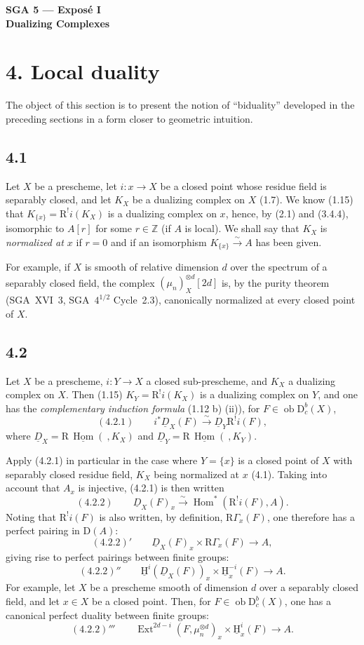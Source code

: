 \documentclass[11pt]{article}
\providecommand{\uH}{\underline{\mathrm H}}
\DeclareMathOperator{\Hom}{Hom}
\DeclareMathOperator{\Ext}{Ext}
\newcommand{\R}{\mathrm{R}}
\newcommand{\D}{\mathrm{D}}
\newcommand{\Z}{\mathbb{Z}}
\newcommand{\ob}{\operatorname{ob}}
\begin{document}
\begin{center}{\Large \textbf{SGA 5 --- Exposé I}}\\{\large \textbf{Dualizing Complexes}}\end{center}


\section*{4. Local duality}

The object of this section is to present the notion of ``biduality'' developed in the preceding sections in a form closer to geometric intuition.

\subsection*{4.1}
Let $X$ be a prescheme, let $i:x\to X$ be a closed point whose residue field is separably closed, and let $K_X$ be a dualizing complex on $X$ (1.7). We know (1.15) that $K_{\{x\}}=\R^{!}i(K_X)$ is a dualizing complex on $x$, hence, by (2.1) and (3.4.4), isomorphic to $A[r]$ for some $r\in\Z$ (if $A$ is local). We shall say that $K_X$ is \emph{normalized at $x$} if $r=0$ and if an isomorphism $K_{\{x\}}\xrightarrow{\sim}A$ has been given.

For example, if $X$ is smooth of relative dimension $d$ over the spectrum of a separably closed field, the complex $(\mu_n)_X^{\otimes d}[2d]$ is, by the purity theorem (SGA~XVI~3, SGA~$4^{1/2}$ Cycle~2.3), canonically normalized at every closed point of $X$.

\subsection*{4.2}
Let $X$ be a prescheme, $i:Y\to X$ a closed sub-prescheme, and $K_X$ a dualizing complex on $X$. Then (1.15) $K_Y=\R^{!}i(K_X)$ is a dualizing complex on $Y$, and one has the \emph{complementary induction formula} (1.12 b) (ii)), for $F\in \ob\D_c^b(X)$,
\[
(4.2.1)\qquad i^*\underline{D}_X(F)\xrightarrow{\sim}\underline{D}_Y\R^{!}i(F),
\]
where $\underline{D}_X=\R\,\underline{\Hom}(\ ,K_X)$ and $\underline{D}_Y=\R\,\underline{\Hom}(\ ,K_Y)$.

Apply (4.2.1) in particular in the case where $Y=\{x\}$ is a closed point of $X$ with separably closed residue field, $K_X$ being normalized at $x$ (4.1). Taking into account that $A_x$ is injective, (4.2.1) is then written
\[
(4.2.2)\qquad \underline{D}_X(F)_x\xrightarrow{\sim}\Hom^*(\R^{!}i(F),A).
\]
Noting that $\R^{!}i(F)$ is also written, by definition, $\R\Gamma_x(F)$, one therefore has a perfect pairing in $\D(A)$:
\[
(4.2.2)'\qquad \underline{D}_X(F)_x\times \R\Gamma_x(F)\longrightarrow A,
\]
giving rise to perfect pairings between finite groups:
\[
(4.2.2)''\qquad \uH^i(\underline{D}_X(F))_x\times \uH_x^{-i}(F)\longrightarrow A.
\]
For example, let $X$ be a prescheme smooth of dimension $d$ over a separably closed field, and let $x\in X$ be a closed point. Then, for $F\in\ob\D_c^b(X)$, one has a canonical perfect duality between finite groups:
\[
(4.2.2)'''\qquad \Ext^{2d-i}(F,\mu_n^{\otimes d})_x\times \uH_x^i(F)\longrightarrow A.
\]
\end{document}
